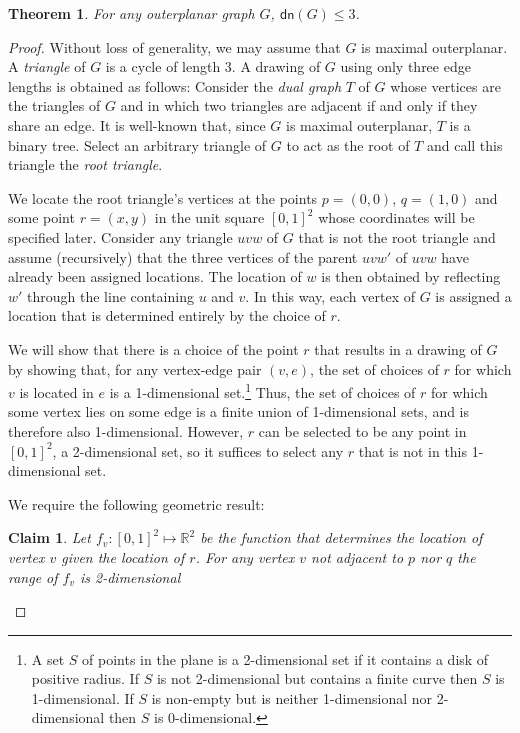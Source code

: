 \documentclass{article}
\newtheorem{thm}{Theorem}
\newtheorem{clm}{Claim}
\newcommand{\dn}{\mathsf{dn}}
\begin{document}
\begin{thm}
For any outerplanar graph $G$, $\dn(G)\le 3$.
\end{thm}

\begin{proof} 
Without loss of generality, we may assume that $G$ is maximal
outerplanar.  A \emph{triangle} of $G$ is a cycle of length 3.  A
drawing of $G$ using only three edge lengths is obtained as follows:
Consider the \emph{dual graph} $T$ of $G$ whose vertices are the
triangles of $G$ and in which two triangles are adjacent if and only
if they share an edge.  It is well-known that, since $G$ is maximal
outerplanar, $T$ is a binary tree. Select an arbitrary triangle of $G$
to act as the root of $T$ and call this triangle the \emph{root
triangle}.

We locate the root triangle's vertices at the points $p=(0,0)$,
$q=(1,0)$ and some point $r=(x,y)$ in the unit square $[0,1]^2$ whose
coordinates will be specified later.  Consider any triangle $uvw$ of
$G$ that is not the root triangle and assume (recursively) that the
three vertices of the parent $uvw'$ of $uvw$ have already been
assigned locations.  The location of $w$ is then obtained by
reflecting $w'$ through the line containing $u$ and $v$.  In this way,
each vertex of $G$ is assigned a location that is determined entirely
by the choice of $r$.

We will show that there is a choice of the point $r$ that results in
a drawing of $G$ by showing that, for any vertex-edge pair
$(v,e)$, the set of choices of $r$ for which $v$ is located in
$e$ is a 1-dimensional set.\footnote{A set $S$ of points in the
plane is a 2-dimensional set if it contains a disk of positive radius.
If $S$ is not 2-dimensional but contains a finite curve then $S$ is
1-dimensional.  If $S$ is non-empty but is neither 1-dimensional nor
2-dimensional then $S$ is $0$-dimensional.} Thus, the set of choices
of $r$ for which some vertex lies on some edge is a finite union of
1-dimensional sets, and is therefore also 1-dimensional.  However,
$r$ can be selected to be any point in $[0,1]^2$, a 2-dimensional
set, so it suffices to select any $r$ that is not in this
1-dimensional set.

We require the following geometric result:

\begin{clm}
Let $f_v:[0,1]^2\mapsto\mathbb{R}^2$ be the function that determines
the location of vertex $v$ given the location of $r$.  For any vertex
$v$ not adjacent to $p$ nor $q$ the range of $f_v$ is 2-dimensional
\end{clm}



\end{proof}
\end{document}
